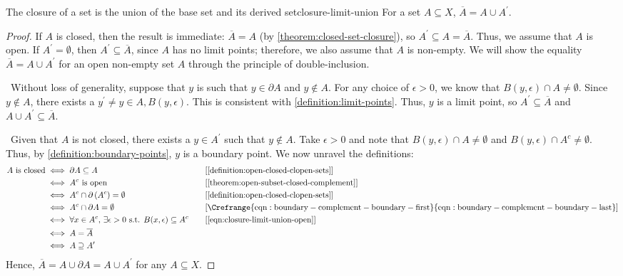 \documentclass{article}
\newcommand*\iffforward{\par\boxed\Longrightarrow\ }
\newcommand*\iffbackward{\par\boxed\Longleftarrow\ }
\numberwithin{equation}{section}
\numberwithin{figure}{section}
\begin{document}
\begin{theorem}{The closure of a set is the union of the base set and its
        derived set}{closure-limit-union}
    For a set $ A \subseteq X $, $ \overline{A} = A \cup A^\prime $.
    \begin{proof}
        If $ A $ is closed, then the result is immediate: $ \overline{A} = A $
        (by \cref{theorem:closed-set-closure}), so $ A^\prime \subseteq A =
        \overline{A} $. Thus, we assume that $ A $ is open. If $ A^\prime =
        \emptyset $, then $ A^\prime \subseteq \overline{A} $, since $ A $ has
        no limit points; therefore, we also assume that $ A $ is non-empty. We
        will show the equality $ \overline{A} = A \cup A^\prime $ for an open
        non-empty set $ A $ through the principle of double-inclusion.

        \iffforward Without loss of generality, suppose that $ y $ is such that
        $ y \in \partial A $ and $ y \not\in A $. For any choice of $ \epsilon >
        0 $, we know that $ B(y, \epsilon) \cap A \neq \emptyset $. Since $ y
        \not\in A $, there exists a $ y^\prime \neq y \in A, B(y, \epsilon) $.
        This is consistent with \cref{definition:limit-points}. Thus, $ y $ is a
        limit point, so $ A^\prime \subseteq \overline{A} $ and $ A \cup
        A^\prime \subseteq \overline{A} $.

        \iffbackward Given that $ A $ is not closed, there exists a $ y \in
        A^\prime $ such that $ y \not\in A $. Take $ \epsilon > 0 $ and note
        that $ B(y, \epsilon) \cap A \neq \emptyset $ and $ B(y, \epsilon) \cap
        A^c \neq \emptyset $. Thus, by \cref{definition:boundary-points}, $ y $
        is a boundary point. We now unravel the definitions:
        \begin{alignat}{2}
            A \text{ is closed} &\iff \partial A \subseteq A
                &&\mathrm{[\Cref{definition:open-closed-clopen-sets}]} \\
            &\iff A^c \text{ is open}
                &&\mathrm{[\Cref{theorem:open-subset-closed-complement}]}%
                \label{eqn:closure-limit-union-open} \\
            &\iff A^c \cap \partial \left( A^c \right) = \emptyset
                &&\mathrm{[\Cref{definition:open-closed-clopen-sets}]} \\
            &\iff A^c \cap \partial A = \emptyset
                &&\mathrm{[\Crefrange{eqn:boundary-complement-boundary-first}%
                    {eqn:boundary-complement-boundary-last}]} \\
            &\iff \forall x \in A^c,\, \exists \epsilon > 0 \text{ s.t. }
                B(x, \epsilon) \subseteq A^c\quad
                &&\mathrm{[\Cref{eqn:closure-limit-union-open}]} \\
            &\iff A = \overline{A} \\
            &\iff A \supseteq A^\prime
        \end{alignat}
        Hence, $ \overline{A} = A \cup \partial A = A \cup A^\prime $ for any
        $ A \subseteq X $.
    \end{proof}
\end{theorem}
\end{document}
